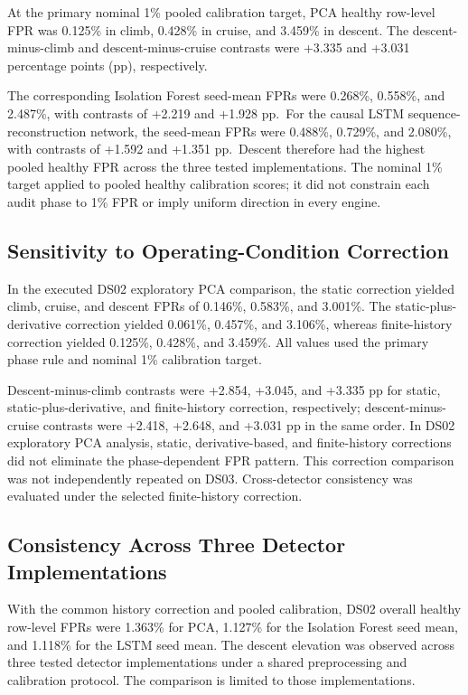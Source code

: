 \documentclass[10pt,twocolumn]{article}
\begin{document}
At the primary nominal 1\% pooled calibration target, PCA healthy row-level FPR was 0.125\% in climb, 0.428\% in cruise, and 3.459\% in descent. The descent-minus-climb and descent-minus-cruise contrasts were +3.335 and +3.031 percentage points (pp), respectively.

The corresponding Isolation Forest seed-mean FPRs were 0.268\%, 0.558\%, and 2.487\%, with contrasts of +2.219 and +1.928 pp.~For the causal LSTM sequence-reconstruction network, the seed-mean FPRs were 0.488\%, 0.729\%, and 2.080\%, with contrasts of +1.592 and +1.351 pp.~Descent therefore had the highest pooled healthy FPR across the three tested implementations. The nominal 1\% target applied to pooled healthy calibration scores; it did not constrain each audit phase to 1\% FPR or imply uniform direction in every engine.

\subsection{Sensitivity to Operating-Condition Correction}\label{sensitivity-to-operating-condition-correction}

In the executed DS02 exploratory PCA comparison, the static correction yielded climb, cruise, and descent FPRs of 0.146\%, 0.583\%, and 3.001\%. The static-plus-derivative correction yielded 0.061\%, 0.457\%, and 3.106\%, whereas finite-history correction yielded 0.125\%, 0.428\%, and 3.459\%. All values used the primary phase rule and nominal 1\% calibration target.

Descent-minus-climb contrasts were +2.854, +3.045, and +3.335 pp for static, static-plus-derivative, and finite-history correction, respectively; descent-minus-cruise contrasts were +2.418, +2.648, and +3.031 pp in the same order. In DS02 exploratory PCA analysis, static, derivative-based, and finite-history corrections did not eliminate the phase-dependent FPR pattern. This correction comparison was not independently repeated on DS03. Cross-detector consistency was evaluated under the selected finite-history correction.

\subsection{Consistency Across Three Detector Implementations}\label{consistency-across-three-detector-implementations}

With the common history correction and pooled calibration, DS02 overall healthy row-level FPRs were 1.363\% for PCA, 1.127\% for the Isolation Forest seed mean, and 1.118\% for the LSTM seed mean. The descent elevation was observed across three tested detector implementations under a shared preprocessing and calibration protocol. The comparison is limited to those implementations.
\end{document}
